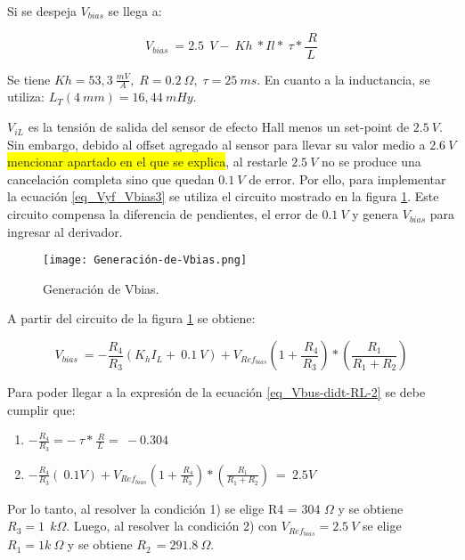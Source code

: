 \noindent Si se despeja $V_{bias}$ se llega a:

\begin{equation} \label{eq_Vyf-Vbias4}
	V_{bias}\ =2.5\ \:V -\ Kh\ *Il*\ \tau *\frac{\ R}{L}
\end{equation}

\noindent Se tiene $Kh = 53,3\:\frac{mV}{A},\; R = 0.2\:\Omega,\; \tau  = 25 \:ms$. En cuanto a la inductancia, se utiliza:  $L_T(4\:mm) = 16,44\:mHy$.

\noindent $V_{iL}$ es la tensi\'{o}n de salida del sensor de efecto Hall menos un set-point de $2.5\:V$. Sin embargo, debido al offset agregado al sensor para llevar su valor medio a $2.6\:V$ \colorbox{yellow}{mencionar apartado en el que se explica}, al restarle $2.5\:V$ no se produce una cancelaci\'{o}n completa sino que quedan $0.1\:V$ de error. Por ello, para implementar la ecuaci\'{o}n  \ref{eq_Vyf_Vbias3} se utiliza el circuito mostrado en la figura \ref{fig:img_Generación_de_Vbias}. Este circuito compensa la diferencia de pendientes, el error de $0.1\:V$ y genera $V_{bias}$ para ingresar al derivador.

\begin{figure}[H]
	\centering
	\texttt{[image: Generación-de-Vbias.png]}
	\caption{Generación de Vbias.}
	\label{fig:img_Generación_de_Vbias}
\end{figure}

\noindent A partir del circuito de la figura \ref{fig:img_Generación_de_Vbias} se obtiene:

\begin{equation} \label{eq_Vyf-Vbias3}
	V_{bias}\ =-\frac{R_4}{R_3}(K_hI_L+\ 0.1\:V)+V_{Ref_{bias}}(1+\frac{\ R_4}{R_3})*(\frac{R_1}{R_1+R_2})
\end{equation}

\noindent Para poder llegar a la expresi\'{o}n de la ecuaci\'{o}n \ref{eq_Vbus-didt-RL-2} se debe cumplir que:

\begin{enumerate}
	\item  $-\frac{R_4}{R_3}=-\ \tau *\frac{\ R}{L}=\ -0.304$  
	
	\item  $-\frac{R_4}{R_3}(\ 0.1V)+V_{Ref_{bias}}(1+\frac{\ R_4}{R_3})*(\frac{R_1}{R_1+R_2})\ =\ 2.5V$     
\end{enumerate}

\noindent Por lo tanto, al resolver la condici\'{o}n 1) se elige R4 = 304 $\mathit{\Omega}$ y se obtiene $R_3=1\ \:{k\mathit{\Omega}}$. Luego, al resolver la condici\'{o}n 2) con $V_{Ref_{bias}}=2.5\:V$ se elige $R_1=1k\:\mathit{\Omega}$ y se obtiene $R_{2\ }=291.8\:\mathit{\Omega}.$


